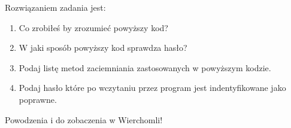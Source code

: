 \documentclass{article}
\begin{document}
Rozwiązaniem zadania jest:
\begin{enumerate}
\item Co zrobiłeś by zrozumieć powyższy kod?
\item W jaki sposób powyższy kod sprawdza hasło?
\item Podaj listę metod zaciemniania zastosowanych w powyższym kodzie.
\item Podaj hasło które po wczytaniu przez program jest indentyfikowane jako poprawne.
\end{enumerate}

\normalsize

\centering
\LARGE{Powodzenia i do zobaczenia w Wierchomli!}
\end{document}
